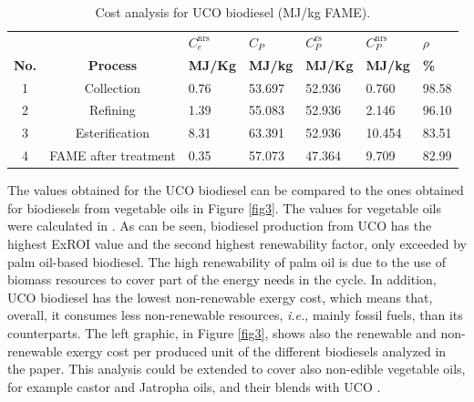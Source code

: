 \documentclass[sustainability,article,accept,moreauthors,pdftex,12pt,a4paper]{mdpi}
\newcommand{\ems}[3][\phantom{\ast}]{\ensuremath{{#2}_{#3}^\mathrm{#1}}}
\begin{document}
\begin{table}[H]
 \centering
 \caption[Cost analysis for UCO biodisel]{Cost analysis for UCO biodiesel (MJ/kg FAME).}
 \begin{tabularx}{0.8\textwidth}{ccZZZZZ}
 \toprule
  &       & \boldmath$\ems[nrs]{C}{e}$ & \boldmath$C_P$ & \boldmath$\ems[rs]{C}{P}$ & \boldmath$\ems[nrs]{C}{P}$ & \boldmath$\rho$ \\
 \textbf{No. } &\textbf{ Process     }& \textbf{MJ/Kg } & \textbf{MJ/kg} & \textbf{MJ/Kg} & \textbf{MJ/kg} & \textbf{\%} \\
  & Collection   & 0.76 & 53.697 & 52.936 & 0.760 & 98.58 \\
 2 & Refining    & 1.39 & 55.083 & 52.936 & 2.146 & 96.10 \\
 3 & Esterification  & 8.31 & 63.391 & 52.936 & 10.454 & 83.51 \\
 4 & FAME after treatment & 0.35 & 57.073 & 47.364 & 9.709 & 82.99 \\
 \bottomrule
 \end{tabularx}%
 \label{table5}%
\end{table}%

The values obtained for the UCO biodiesel can be compared to the ones obtained for biodiesels from vegetable oils in Figure \ref{fig3}. The values for vegetable oils were calculated in \cite{FontdeMoraThesis2013}. As can be seen, biodiesel production from UCO has the highest ExROI value and the second highest renewability factor, only exceeded by palm oil-based biodiesel. The high renewability of palm oil is due to the use of biomass resources to cover part of the energy needs in the cycle. In addition, UCO biodiesel has the lowest non-renewable exergy cost, which means that, overall, it consumes less non-renewable resources, \textit{i.e.}, mainly fossil fuels, than its counterparts. The left graphic, in Figure \ref{fig3}, shows also the renewable and non-renewable exergy cost per produced unit of the different biodiesels analyzed in the paper. This analysis could be extended to cover also non-edible vegetable oils, for example castor and Jatropha oils, and their blends with UCO \cite{Kannan2013}.
\end{document}

